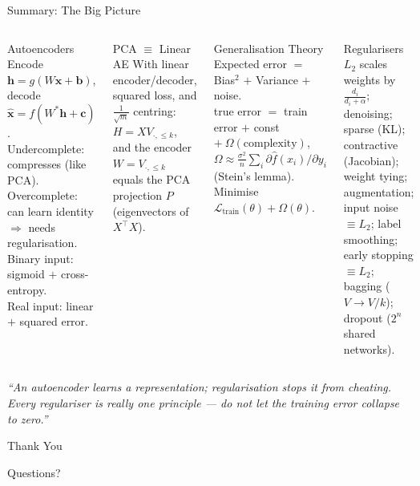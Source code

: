 \documentclass{beamer}
\begin{document}
\begin{frame}[shrink=12]{Summary: The Big Picture}
  \begin{columns}[T]
    \begin{block}{Autoencoders}
      Encode $\mathbf{h}=g(W\mathbf{x}+\mathbf{b})$, decode
      $\hat{\mathbf{x}}=f(W^{*}\mathbf{h}+\mathbf{c})$.\\
      Undercomplete: compresses (like PCA).\\
      Overcomplete: can learn identity $\Rightarrow$ needs regularisation.\\
      Binary input: sigmoid $+$ cross-entropy.\\
      Real input: linear $+$ squared error.
    \end{block}

    \begin{block}{PCA $\equiv$ Linear AE}
      With linear encoder/decoder, squared loss, and
      $\frac{1}{\sqrt m}$ centring: $H = X V_{\cdot,\le k}$, and the
      encoder $W = V_{\cdot,\le k}$ equals the PCA projection $P$
      (eigenvectors of $X^{\top}X$).
    \end{block}

    \begin{block}{Generalisation Theory}
      Expected error $=$ Bias$^2$ $+$ Variance $+$ noise.\\
      true error $=$ train error $+$ const $+\ \Omega(\text{complexity})$,\\
      $\Omega \approx \frac{\sigma^2}{n}\sum_i \partial\hat f(x_i)/\partial y_i$
      (Stein's lemma). Minimise
      $\mathcal L_{\text{train}}(\theta) + \Omega(\theta)$.
    \end{block}

    \begin{alertblock}{Regularisers}
      $L_2$ scales weights by $\frac{d_i}{d_i+\alpha}$; denoising; sparse
      (KL); contractive (Jacobian); weight tying; augmentation; input noise
      $\equiv L_2$; label smoothing; early stopping $\equiv L_2$; bagging
      ($V\!\to\!V/k$); dropout ($2^n$ shared networks).
    \end{alertblock}
  \end{columns}

  \medskip
  \begin{center}
    \large\textit{%
      ``An autoencoder learns a representation; regularisation stops it
        from cheating. Every regulariser is really one principle ---
        do not let the training error collapse to zero.''}
  \end{center}
\end{frame}

\begin{frame}
  \Huge{\centerline{Thank You}}
  \vspace{0.6cm}
  \large{\centerline{Questions?}}
\end{frame}
\end{document}
